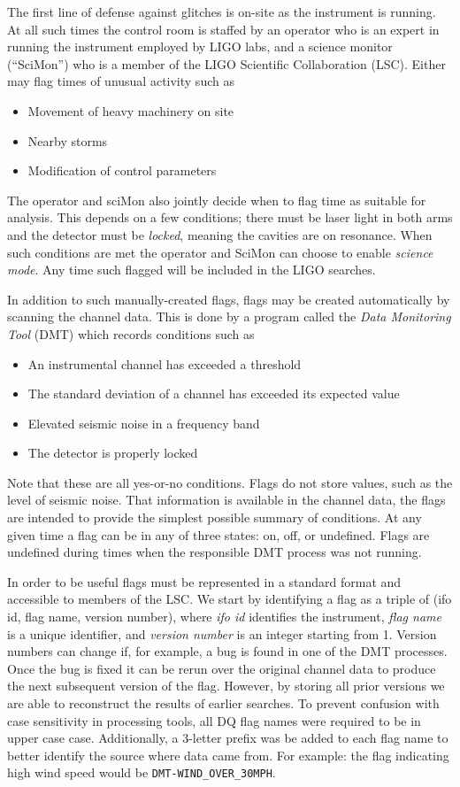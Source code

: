 The first line of defense against glitches is on-site as the
instrument is running.  At all such times the control room is staffed
by an operator who is an expert in running the instrument employed by
LIGO labs, and a science monitor (``SciMon'') who is a member of the
LIGO Scientific Collaboration (LSC).  Either may flag times of unusual
activity such as
\begin{itemize}
\item Movement of heavy machinery on site
\item Nearby storms
\item Modification of control parameters
\end{itemize}
%
The operator and sciMon also jointly decide when to flag time as
suitable for analysis.  This depends on a few conditions; there must
be laser light in both arms and the detector must be \emph{locked},
meaning the cavities are on resonance.  When such conditions are met
the operator and SciMon can choose to enable \emph{science mode}.  Any
time such flagged will be included in the LIGO searches.

In addition to such manually-created flags, flags may be created
automatically by scanning the channel data.  This is done by a program
called the \emph{Data Monitoring Tool} (DMT) which records conditions
such as
%
\begin{itemize}
\item An instrumental channel has exceeded a threshold
\item The standard deviation of a channel has exceeded its expected
value
\item Elevated seismic noise in a frequency band
\item The detector is properly locked
\end{itemize}

Note that these are all yes-or-no conditions.  Flags do not store
values, such as the level of seismic noise.  That information is
available in the channel data, the flags are intended to provide the
simplest possible summary of conditions.  At any given time a flag can
be in any of three states: on, off, or undefined.  Flags are undefined
during times when the responsible DMT process was not running.

In order to be useful flags must be represented in a standard format
and accessible to members of the LSC.  We start by identifying a flag
as a triple of (ifo id, flag name, version number), where \emph{ifo
id} identifies the instrument, \emph{flag name} is a unique
identifier, and \emph{version number} is an integer starting from 1.
Version numbers can change if, for example, a bug is found in one of
the DMT processes.  Once the bug is fixed it can be rerun over the
original channel data to produce the next subsequent version of the
flag.  However, by storing all prior versions we are able to
reconstruct the results of earlier searches.  To prevent confusion
with case sensitivity in processing tools, all DQ flag names were
required to be in upper case case. Additionally, a 3-letter prefix was
be added to each flag name to better identify the source where data
came from. For example: the flag indicating high wind speed would be
\texttt{DMT-WIND\_OVER\_30MPH}.

